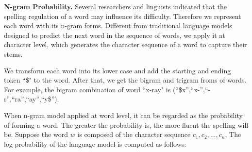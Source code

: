 \textbf{N-gram Probability.} 
Several researchers and linguists indicated that the spelling regulation of a word may influence its difficulty.
Therefore  we represent each word with its n-gram forms.
Different from traditional language models designed to predict the next word in the sequence of words,  we apply it at character level, which generates the character sequence of a word to capture their stems.

We transform each word into its lower case and add the starting and ending token ``\$" to the word. After that, we get the bigram and trigram froms of words. For example, the bigram combination of word ``x-ray" is (``\$x'',``x-'',``-r'',``ra'',``ay'',``y\$'').

When n-gram model applied at word level, it can be regarded as the probability of forming a word. The greater the probability is, the more fluent the spelling will be. 
Suppose the word $w$ is composed of the character sequence $c_1, c_2, \dots, c_n$, 
The log probability of the language model is computed as follows:

